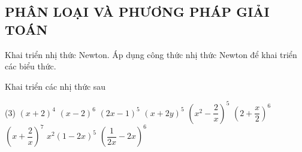 \subsection{PHÂN LOẠI VÀ PHƯƠNG PHÁP GIẢI TOÁN}
\begin{dang}{Khai triển nhị thức Newton.} %
Áp dụng công thức nhị thức Newton để khai triển các biểu thức.
\end{dang}

\begin{vd} Khai triển các nhị thức sau
	\begin{tasks}(3)
		\task $(x+2)^4$
		\task $(x-2)^6$
		\task $\left(2x-1\right)^5$
		\task $\left(x+2y\right)^5$
		\task $\left(x^2-\dfrac{2}{x}\right)^5$
		\task $\left(2+\dfrac{x}{2}\right)^6$
		\task $\left(x+\dfrac{2}{x}\right)^7$
		\task ${x^2}{\left(1-2x\right)^5}$ 
		\task $\left(\dfrac{1}{2x}-2x\right)^6$
	\end{tasks}
\end{vd} 

